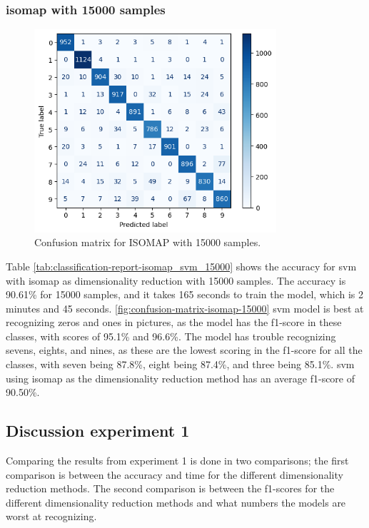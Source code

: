 \subsubsection{\gls{isomap} with 15000 samples}\label{subsubsec:experiment-1-results-isomap-15000}
\begin{figure}[htb!]
    \centering
    \includegraphics[width=0.8\textwidth]{figures/1-experiment/confusion_matrix_isomap_svm_15000.png}
    \caption{Confusion matrix for ISOMAP with 15000 samples.}
    \label{fig:confusion-matrix-isomap-15000}
\end{figure}
Table \ref{tab:classification-report-isomap_svm_15000} shows the accuracy for \gls{svm} with \gls{isomap} as dimensionality reduction with 15000 samples. The accuracy is 90.61\% for 15000 samples, and it takes 165 seconds to train the model, which is 2 minutes and 45 seconds. \autoref{fig:confusion-matrix-isomap-15000} \gls{svm} model is best at recognizing zeros and ones in pictures, as the model has the f1-score in these classes, with scores of 95.1\% and 96.6\%. The model has trouble recognizing sevens, eights, and nines, as these are the lowest scoring in the f1-score for all the classes, with seven being 87.8\%, eight being 87.4\%, and three being 85.1\%. \gls{svm} using \gls{isomap} as the dimensionality reduction method has an average f1-score of 90.50\%.

\subsection{Discussion experiment 1}\label{sec:discussion-experiment-1}
Comparing the results from experiment 1 is done in two comparisons; the first comparison is between the accuracy and time for the different dimensionality reduction methods. The second comparison is between the f1-scores for the different dimensionality reduction methods and what numbers the models are worst at recognizing. 

